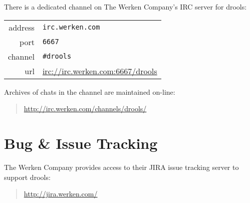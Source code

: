 There is a dedicated channel on The Werken Company's IRC server for
drools:\\

\begin{tabular}{rl}
address & \verb|irc.werken.com| \\
port    & \verb|6667| \\
channel & \verb|#drools|\\
url     & \url{irc://irc.werken.com:6667/drools}\\
\end{tabular}

\bigskip

Archives of chats in the channel are maintained on-line:

\begin{quote}
    \url{http://irc.werken.com/channels/drools/}
\end{quote}

\section{Bug \& Issue Tracking}

The Werken Company provides access to their JIRA issue tracking server
to support drools:

\begin{quote}
    \url{http://jira.werken.com/}
\end{quote}
